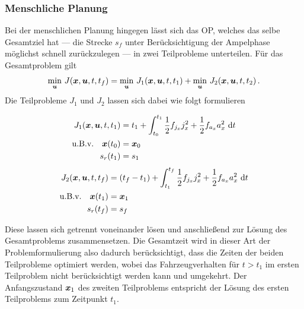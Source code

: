 \subsubsection{Menschliche Planung}\label{subsubsec:Mensch}
Bei der menschlichen Planung hingegen lässt sich das \gls{OP}, welches das selbe Gesamtziel hat --- die Strecke $s_f$ unter Berücksichtigung der Ampelphase möglichst schnell zurückzulegen --- in zwei Teilprobleme unterteilen. Für das Gesamtproblem gilt
\begin{equation}
\min_{\boldsymbol{u}} \, J(\boldsymbol{x},\boldsymbol{u},t,t_f) = \min_{\boldsymbol{u}} \, J_1(\boldsymbol{x},\boldsymbol{u},t,t_1) + \min_{\boldsymbol{u}} \, J_2(\boldsymbol{x},\boldsymbol{u},t,t_2)\,.
\end{equation}
Die Teilprobleme $J_1$ und $J_2$ lassen sich dabei wie folgt formulieren
\begin{multicols}{2}
	\begin{align}
	J_1(\boldsymbol{x},\boldsymbol{u},t,t_1) &= t_1 + \int_{t_0}^{t_1}\frac{1}{2}f_{j_x} j_x^2 + \frac{1}{2}f_{a_x} a_x^2~\textrm{d}{t} \\
	\textrm{u.B.v.} \quad \boldsymbol{x}(t_0) &= \boldsymbol{x}_0 \\
	s_r(t_1) &= s_1 
	\end{align}
	\columnbreak
	\begin{align}
	J_2(\boldsymbol{x},\boldsymbol{u},t,t_f) &= (t_f - t_1) + \int_{t_1}^{t_f}\frac{1}{2}f_{j_x} j_x^2 + \frac{1}{2}f_{a_x} a_x^2~\textrm{d}{t} \\
	\textrm{u.B.v.} \quad \boldsymbol{x}(t_1) &= \boldsymbol{x}_1 \\
	s_r(t_f) &= s_f 
	\end{align}
\end{multicols}
Diese lassen sich getrennt voneinander lösen und anschließend zur Lösung des Gesamtproblems zusammensetzen. Die Gesamtzeit wird in dieser Art der Problemformulierung also dadurch berücksichtigt, dass die Zeiten der beiden Teilprobleme optimiert werden, wobei das Fahrzeugverhalten für $t>t_1$ im ersten Teilproblem nicht berücksichtigt werden kann und umgekehrt. Der Anfangszustand $\boldsymbol{x}_1$ des zweiten Teilproblems entspricht der Lösung des ersten Teilproblems zum Zeitpunkt $t_1$.

